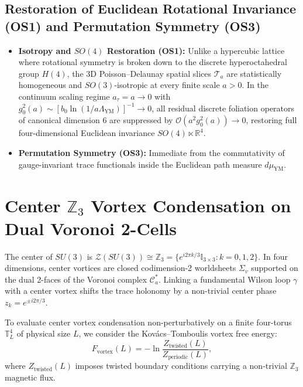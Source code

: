 \documentclass[11pt, a4paper]{article}
\theoremstyle{definition}
\theoremstyle{remark}
\begin{document}
\subsection{Restoration of Euclidean Rotational Invariance (OS1) and Permutation Symmetry (OS3)}

\begin{itemize}
  \item \textbf{Isotropy and $SO(4)$ Restoration (OS1):} Unlike a hypercubic lattice where rotational symmetry is broken down to the discrete hyperoctahedral group $H(4)$, the 3D Poisson--Delaunay spatial slices $\mathcal{T}_{a}$ are statistically homogeneous and $SO(3)$-isotropic at every finite scale $a > 0$. In the continuum scaling regime $a_{\tau} = a \to 0$ with $g_{0}^{2}(a) \sim [b_{0}\ln(1/a\Lambda_{\mathrm{YM}})]^{-1} \to 0$, all residual discrete foliation operators of canonical dimension 6 are suppressed by $\mathcal{O}(a^{2}g_{0}^{2}(a)) \to 0$, restoring full four-dimensional Euclidean invariance $SO(4) \ltimes \mathbb{R}^{4}$.
  \item \textbf{Permutation Symmetry (OS3):} Immediate from the commutativity of gauge-invariant trace functionals inside the Euclidean path measure $d\mu_{\mathrm{YM}}$.
\end{itemize}

\section{Center $\mathbb{Z}_{3}$ Vortex Condensation on Dual Voronoi 2-Cells}

The center of $SU(3)$ is $\mathcal{Z}(SU(3)) \cong \mathbb{Z}_{3} = \{e^{i2\pi k/3}\mathbb{I}_{3\times 3} : k = 0, 1, 2\}$. In four dimensions, center vortices are closed codimension-2 worldsheets $\Sigma_{v}$ supported on the dual 2-faces of the Voronoi complex $\mathcal{C}_{a}^{*}$. Linking a fundamental Wilson loop $\gamma$ with a center vortex shifts the trace holonomy by a non-trivial center phase $z_{k} = e^{\pm i2\pi/3}$.

To evaluate center vortex condensation non-perturbatively on a finite four-torus $\mathbb{T}_{L}^{4}$ of physical size $L$, we consider the Kov\'acs--Tomboulis vortex free energy:
\begin{equation}
  F_{\mathrm{vortex}}(L) = -\ln \frac{Z_{\mathrm{twisted}}(L)}{Z_{\mathrm{periodic}}(L)},
\end{equation}
where $Z_{\mathrm{twisted}}(L)$ imposes twisted boundary conditions carrying a non-trivial $\mathbb{Z}_{3}$ magnetic flux.
\end{document}
